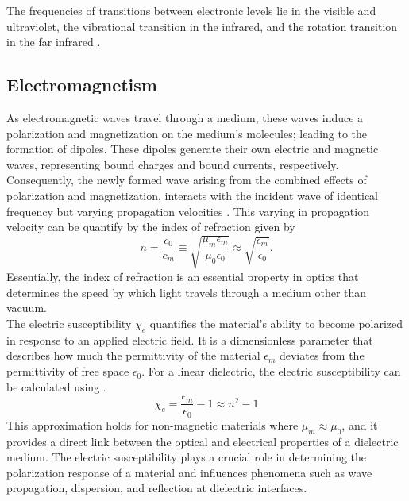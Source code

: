     The frequencies of transitions between electronic levels lie in the
    visible and ultraviolet, the vibrational transition in the infrared, and
    the rotation transition in the far infrared \cite{Schwabl2007}. 

    \subsection{Electromagnetism}
    As electromagnetic waves travel through a medium, these waves induce a
    polarization and magnetization on the medium's molecules; leading to the
    formation of dipoles. These dipoles generate their own electric and
    magnetic waves, representing bound charges and bound currents,
    respectively. Consequently, the newly formed wave arising from the combined
    effects of polarization and magnetization, interacts with the incident wave
    of identical frequency but varying propagation velocities
    \cite{Griffiths2017, Jackson1998}. This varying in propagation velocity can be quantify
    by the index of refraction given by 
    \begin{equation}\label{eq:generalIndexOfRefraction}
        n = \frac{c_0}{c_m} \equiv \sqrt{\frac{\mu_m\epsilon_m}{\mu_0\epsilon_0}}
        \approx \sqrt{\frac{\epsilon_m}{\epsilon_0}}.
    \end{equation}
    Essentially, the index of refraction is an essential property in optics
    that determines the speed by which light travels through a medium other
    than vacuum. \\

    The electric susceptibility $\chi_e$ quantifies
    the material's ability to become polarized in response to an applied
    electric field. It is a dimensionless parameter that describes how much the
    permittivity of the material $\epsilon_m$ deviates from the permittivity of
    free space $\epsilon_0$. For a linear dielectric, the electric
    susceptibility can be calculated using 
    \cite{Griffiths2017,Jackson1998}.
    \begin{equation}\label{eq:electricSusceptibility}
        \chi_e = \frac{\epsilon_m}{\epsilon_0} - 1 \approx n^2 -1  
    \end{equation}
    This approximation holds for non-magnetic materials where $\mu_m \approx
    \mu_0$, and it provides a direct link between the optical and electrical
    properties of a dielectric medium. The electric susceptibility plays a
    crucial role in determining the polarization response of a material and
    influences phenomena such as wave propagation, dispersion, and reflection
    at dielectric interfaces.

